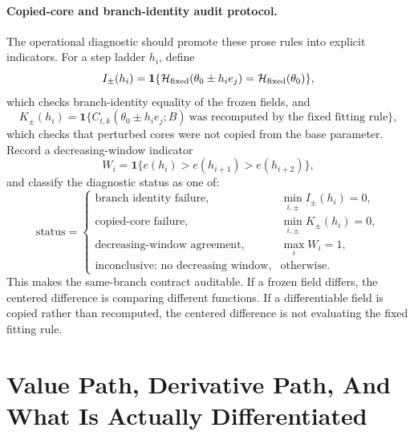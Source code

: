 \paragraph{Copied-core and branch-identity audit protocol.}
The operational diagnostic should promote these prose rules into explicit
indicators.  For a step ladder \(h_i\), define
\begin{equation}
  I_\pm(h_i)=\mathbf{1}\{\mathcal H_{\rm fixed}(\theta_0\pm h_i e_j)=\mathcal H_{\rm fixed}(\theta_0)\},
  \label{eq:bf-hd-ttkr-branch-indicator}
\end{equation}
which checks branch-identity equality of the frozen fields, and
\begin{equation}
  K_\pm(h_i)=\mathbf{1}\{C_{t,k}(\theta_0\pm h_i e_j;B)\ \text{was recomputed by the fixed fitting rule}\},
  \label{eq:bf-hd-ttkr-copied-core-indicator}
\end{equation}
which checks that perturbed cores were not copied from the base parameter.
Record a decreasing-window indicator
\begin{equation}
  W_i=\mathbf{1}\{e(h_i)>e(h_{i+1})>e(h_{i+2})\},
  \label{eq:bf-hd-ttkr-decreasing-window}
\end{equation}
and classify the diagnostic status as one of:
\begin{equation}
\text{status}=
\begin{cases}
\text{branch identity failure},&\min_{i,\pm} I_\pm(h_i)=0,\\
\text{copied-core failure},&\min_{i,\pm} K_\pm(h_i)=0,\\
\text{decreasing-window agreement},&\max_i W_i=1,\\
\text{inconclusive: no decreasing window},&\text{otherwise}.
\end{cases}
  \label{eq:bf-hd-ttkr-fd-status}
\end{equation}
This makes the same-branch contract auditable.  If a frozen field differs, the
centered difference is comparing different functions.  If a differentiable field
is copied rather than recomputed, the centered difference is not evaluating the
fixed fitting rule.

\section[Value and derivative paths]{Value Path, Derivative Path, And What Is Actually Differentiated}
\label{sec:bf-hd-derivative-ledger}

